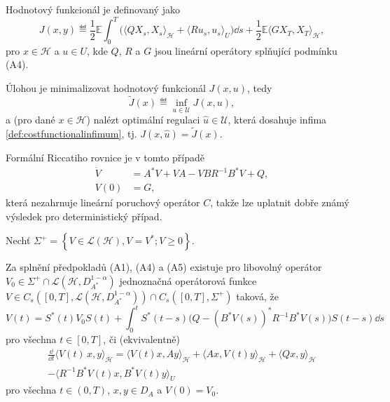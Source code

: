 \begin{definice}
Hodnotový funkcionál je definovaný jako
\begin{equation}
    J (x,y) \eqdef \frac{1}{2}\mathbb{E}\int_0^T \big( \langle Q X_s,
    X_s \rangle_\mathscr{H} + \langle R u_s, u_s\rangle_U \big) \dd s +
    \frac{1}{2} \mathbb{E} \langle G X_T, X_T \rangle_\mathscr{H},
    \label{def:costfunctional}
\end{equation}
pro $x\in\mathscr{H}$ a $u\in U$, kde $Q$, $R$ a $G$ jsou lineární
operátory splňující podmínku (A4).
\end{definice}

Úlohou je minimalizovat hodnotový funkcionál $J(x,u)$, tedy
\begin{equation}
    \tilde{J}(x) \eqdef \inf_{u\in\mathscr{U}} J(x,u),
    \label{def:costfunctionalinfimum}
\end{equation}
a (pro dané $x\in\mathscr{H}$) nalézt optimální regulaci
$\hat{u}\in\mathscr{U}$, která dosahuje infima 
\eqref{def:costfunctionalinfimum}, tj. $J(x,\hat{u}) = \tilde{J}(x)$.

Formální Riccatiho rovnice je v tomto případě
\begin{align}
	\dot{V} &= A^*V + VA - VBR^{-1}B^{*}V + Q,
	\label{Riccati}\\
	V(0) &= G,
\end{align}
která nezahrnuje lineární poruchový operátor $C$, takže lze uplatnit 
dobře známý výsledek pro deterministický případ.

Nechť $\Sigma^+ = \left\{ V\in\mathscr{L}(\mathscr{H}),V=V^*;V\geq0 \right\}$.

\begin{veta}
	Za splnění předpokladů (A1), (A4) a (A5) existuje pro libovolný operátor $V_0\in\Sigma^+\cap
	\mathscr{L}(\mathscr{H}, D_{A^*}^{1-\alpha})$ jednoznačná operátorová funkce 
	$V\in C_s([0,T],\mathscr{L}(\mathscr{H}, D_{A^*}^{1-\alpha}))\cap C_s([0,T],\Sigma^+)$
	taková, že
	\begin{equation}
		V(t) = S^*(t) V_0 S(t) + \int_0^t S^*(t-s)\big(Q-\left( B^*V(s) \right)^* R^{-1}B^*V(s)
		\big) S(t-s) \dd s
		\label{V}
	\end{equation}
	pro všechna $t\in[0,T]$, či (ekvivalentně)
	\begin{multline}
		\frac{\dd}{\dd t} \langle V(t)\,x,y\rangle_\mathscr{H} =
                \langle V(t)x, Ay\rangle_\mathscr{H} + \langle Ax, V(t)y\rangle_\mathscr{H} +
                \langle Qx,y\rangle_\mathscr{H} \\
                - \langle R^{-1}B^*V(t)x,B^*V(t)y\rangle_U
		\label{V2}
        \end{multline}
        pro všechna $t\in\left( 0,T \right)$, $x,y\in D_A$ a $V(0)=V_0$.
\end{veta}

